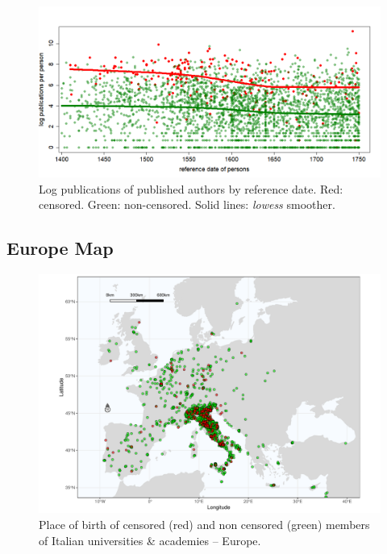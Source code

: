 \begin{figure}[htb]
	\begin{center}
			\includegraphics[width=.99\textwidth,trim=0cm 0cm 0cm 1.5cm, clip]{smoothed.png}
		\caption{Log publications of published authors by reference date. Red: censored. Green: non-censored.  Solid lines: \textit{lowess} smoother.}\label{fig:alter}
	\end{center}
\end{figure}

\clearpage

\subsection{Europe Map}\label{app:europe}


\begin{figure}[htb]
\begin{center}
\includegraphics[width=16cm,trim=1cm 0cm 1cm 0cm,clip,angle=90,origin=c]{map-europe.pdf}
\end{center}
\caption{Place of birth of censored (red) and non censored (green) members of Italian universities \& academies  -- Europe.}\label{fig:europe}
\end{figure}

\clearpage
